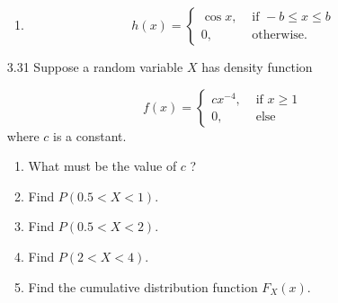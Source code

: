 \documentclass[10pt]{article}
\begin{document}
\begin{itemize}
\begin{enumerate}
      \item
        \[ h(x)=
          \begin{cases}
            \cos x, & \text { if }-b \leq x \leq b \\
            0, & \text { otherwise. }
          \end{cases}
        \]

    \end{enumerate}

  \item[3.31] Suppose a random variable $X$ has density function

    \[ f(x)=
      \begin{cases}
        c x^{-4}, & \text { if } x \geq 1 \\
        0, & \text { else }
      \end{cases}
      \]
    where $c$ is a constant.
    \begin{enumerate}
      \item What must be the value of $c$ ?
      \item Find $P(0.5<X<1)$.
      \item Find $P(0.5<X<2)$.
      \item Find $P(2<X<4)$.
      \item Find the cumulative distribution function $F_{X}(x)$.
    \end{enumerate}

\end{itemize}
\end{document}
